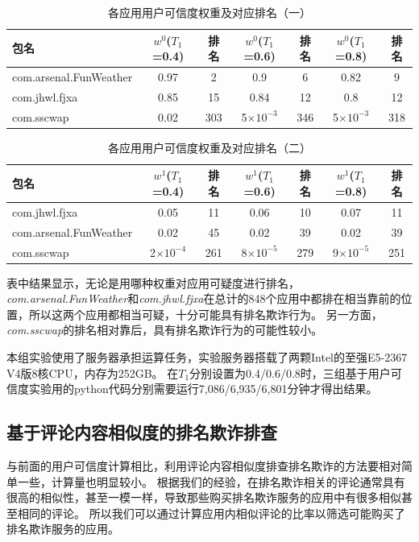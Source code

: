 \begin{table}[htbp]
	\renewcommand{\arraystretch}{1}
	\small
	\centering
	\caption{各应用用户可信度权重及对应排名（一）}
	\vspace{1mm}
	\begin{tabular}{lcccccc}
		\toprule
		包名 & $w^0$($T_1$=0.4) & 排名 & $w^0$($T_1$=0.6) & 排名 & $w^0$($T_1$=0.8) & 排名 \\
		\midrule
		com.arsenal.FunWeather & 0.97 & 2 & 0.9 & 6 & 0.82 & 9 \\
		\rowcolor{gray!15} com.jhwl.fjxa & 0.85 & 15 & 0.84 & 12 & 0.8 & 12 \\
		com.sscwap & 0.02 & 303 & 5$\times10^{-3}$ & 346 & 5$\times10^{-3}$ & 318 \\
		\bottomrule
	\end{tabular}
	\label{table:usr-cred-res-1}
\end{table}

\begin{table}[htbp]
	\renewcommand{\arraystretch}{1}
	\small
	\centering
	\caption{各应用用户可信度权重及对应排名（二）}
	\vspace{1mm}
	\begin{tabular}{lcccccc}
		\toprule
		包名 & $w^1$($T_1$=0.4) & 排名 & $w^1$($T_1$=0.6) & 排名 & $w^1$($T_1$=0.8) & 排名 \\
		\midrule
		com.jhwl.fjxa & 0.05 & 11 & 0.06 & 10 & 0.07 & 11 \\
		\rowcolor{gray!15} com.arsenal.FunWeather & 0.02 & 45 & 0.02 & 39 & 0.02 & 39 \\
		com.sscwap & 2$\times10^{-4}$ & 261 & 8$\times10^{-5}$ & 279 & 9$\times10^{-5}$ & 251 \\
		\bottomrule
	\end{tabular}
	\label{table:usr-cred-res-2}
\end{table}

表中结果显示，无论是用哪种权重对应用可疑度进行排名，\emph{com.arsenal.FunWeather}和\emph{com.jhwl.fjxa}在总计的848个应用中都排在相当靠前的位置，所以这两个应用都相当可疑，十分可能具有排名欺诈行为。
另一方面，\emph{com.sscwap}的排名相对靠后，具有排名欺诈行为的可能性较小。

本组实验使用了服务器承担运算任务，实验服务器搭载了两颗Intel的至强E5-2367 V4版8核CPU，内存为252GB。
在$T_1$分别设置为0.4/0.6/0.8时，三组基于用户可信度实验用的python代码分别需要运行7,086/6,935/6,801分钟才得出结果。

\subsection{基于评论内容相似度的排名欺诈排查}
与前面的用户可信度计算相比，利用评论内容相似度排查排名欺诈的方法要相对简单一些，计算量也明显较小。
根据我们的经验，在排名欺诈相关的评论通常具有很高的相似性，甚至一模一样，导致那些购买排名欺诈服务的应用中有很多相似甚至相同的评论。
所以我们可以通过计算应用内相似评论的比率以筛选可能购买了排名欺诈服务的应用。

